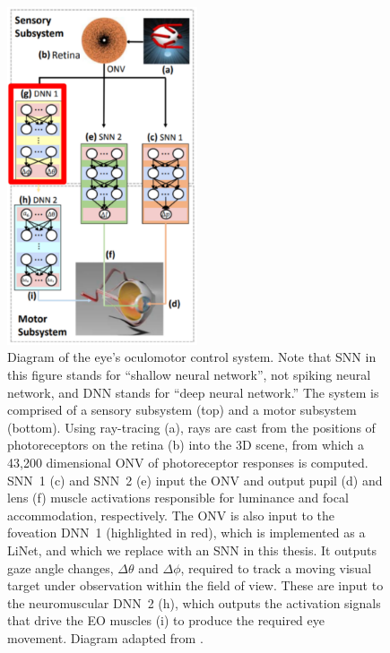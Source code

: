 \documentclass [MS] {UCLAthesis}
\begin{document}
\begin{figure}
    \centering
    \includegraphics[width=0.5\textwidth]{subsystem_summary2}
    \caption[Diagram of the oculomotor control system]{Diagram of the eye's oculomotor control system. Note that SNN in this figure stands for ``shallow neural network'', not spiking neural network, and DNN stands for ``deep neural network.'' The system is comprised of a sensory subsystem (top) and a motor subsystem (bottom). Using ray-tracing (a), rays are cast from the positions of photoreceptors on the retina (b) into the 3D scene, from which a 43,200 dimensional ONV of photoreceptor responses is computed. SNN~1 (c) and SNN~2 (e) input the ONV and output pupil (d) and lens (f) muscle activations responsible for luminance and focal accommodation, respectively. The ONV is also input to the foveation DNN~1 (highlighted in red), which is implemented as a LiNet, and which we replace with an SNN in this thesis. It outputs gaze angle changes, $\Delta\theta$ and $\Delta\phi$, required to track a moving visual target under observation within the field of view. These are input to the neuromuscular DNN~2 (h), which outputs the activation signals that drive the EO muscles (i) to produce the required eye movement. Diagram adapted from \citep{Arjun}. }
    \label{fig:eye_controller_summary}
\end{figure}
\end{document}
